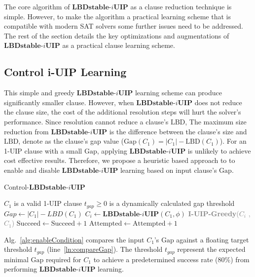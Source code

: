 \documentclass[runningheads]{llncs}
\newcommand{\oneUIPClause}{\ensuremath{C_{1}}}
\newcommand{\iUIPClause}{\ensuremath{C_{i}}}
\newcommand{\LBD}{\text{LBD}}
\newcommand{\GAP}{\text{Gap}}
\newcommand{\IUIP}{\textbf{LBDstable-$i$UIP}}
\begin{document}
The core algorithm of $\IUIP$ as a clause reduction technique is
simple. However, to make the algorithm a practical learning scheme
that is compatible with modern SAT solvers some further issues need to
be addressed. The rest of the section details the key optimizations
and augmentations of $\IUIP$ as a practical clause learning scheme.

\subsection{Control i-UIP Learning}
This simple and greedy $\IUIP$ learning scheme can produce
significantly smaller clause. However, when $\IUIP$ does not reduce
the clause size, the cost of the additional resolution steps will hurt
the solver's performance. Since resolution cannot reduce a clause's
$\LBD$, The maximum size reduction from $\IUIP$ is the difference
between the clause's size and $\LBD$, denote as the clause's gap value
($\GAP(\oneUIPClause) = |\oneUIPClause| - \LBD(\oneUIPClause)$). For
an 1-UIP clause with a small $\GAP$, applying $\IUIP$ is unlikely to
achieve cost effective results. Therefore, we propose a heuristic
based approach to to enable and disable $\IUIP$ learning based on
input clause's $\GAP$.

\begin{algorithm}[b]
\caption{Control-$\IUIP$}\label{alg:enableCondition}
\begin{algorithmic}[1]
\Require  $\oneUIPClause$ is a valid 1-UIP clause
\Require  $ t_{gap} \ge 0$ is a dynamically calculated gap threshold
\Procedure{Control-$\IUIP$}{$\oneUIPClause,  t_{gap}$} 
    \State $Gap \gets |\oneUIPClause| - \textit{LBD}(\oneUIPClause)$
      \label{ln:compareGap}
        \State $\iUIPClause \gets \IUIP(\oneUIPClause, \phi)$
        \State \textcolor{gray}{\textbf{I-UIP-Greedy}($\iUIPClause$ , $\oneUIPClause$)}
        \If {$|\iUIPClause| < |\oneUIPClause|$} 
            \State $\text{Succeed} \gets \text{Succeed}+1$ \label{ln:updateS}
        \EndIf
        \State $\text{Attempted} \gets \text{Attempted}+1$ \label{ln:updateA}
     \EndIf
\EndProcedure
\end{algorithmic}
\end{algorithm}

Alg.~\ref{alg:enableCondition} compares the input $\oneUIPClause$'s
$\GAP$ against a floating target threshold $t_{gap}$
(line~\ref{ln:compareGap}). The threshold $t_{gap}$ represent the
expected minimal $\GAP$ required for $\oneUIPClause$ to achieve a
predetermined success rate (80\%) from performing $\IUIP$ learning.
\end{document}
